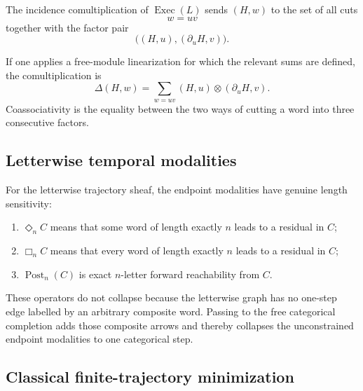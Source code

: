 \begin{proposition}
\label{prop:objective-word-deconcatenation}
The incidence comultiplication of \(\operatorname{Exec}(L)\) sends
\((H,w)\) to the set of all cuts
\[
    w=uv
\]
together with the factor pair
\[
    \bigl((H,u),(\partial_uH,v)\bigr).
\]
\end{proposition}

If one applies a free-module linearization for which the relevant sums are
defined, the comultiplication is
\[
    \Delta(H,w)
    =
    \sum_{w=uv}
    (H,u)
    \otimes
    (\partial_uH,v).
\]
Coassociativity is the equality between the two ways of cutting a word into
three consecutive factors.

\subsection{Letterwise temporal modalities}
\label{subsec:letterwise-temporal-modalities}

For the letterwise trajectory sheaf, the endpoint modalities have genuine
length sensitivity:
\begin{enumerate}
    \item \(\Diamond_nC\) means that some word of length exactly \(n\)
    leads to a residual in \(C\);
    \item \(\Box_nC\) means that every word of length exactly \(n\) leads
    to a residual in \(C\);
    \item \(\operatorname{Post}_n(C)\) is exact \(n\)-letter forward
    reachability from \(C\).
\end{enumerate}

These operators do not collapse because the letterwise graph has no
one-step edge labelled by an arbitrary composite word. Passing to the free
categorical completion adds those composite arrows and thereby collapses the
unconstrained endpoint modalities to one categorical step.

\subsection{Classical finite-trajectory minimization}
\label{subsec:classical-finite-trajectory-minimization}

